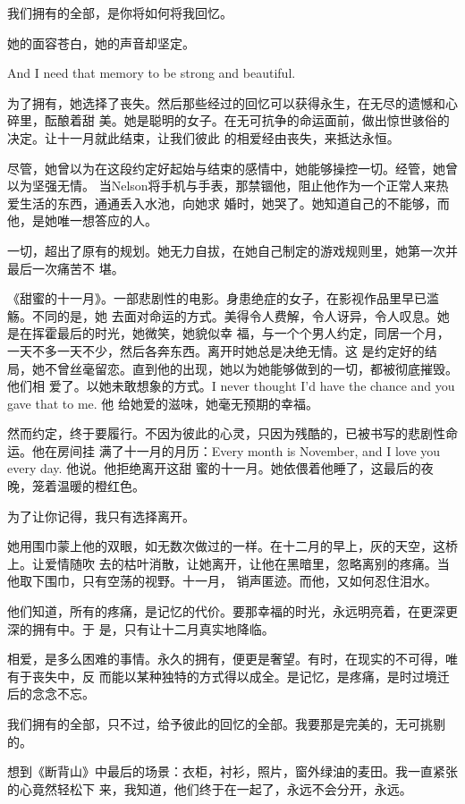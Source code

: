 		我们拥有的全部，是你将如何将我回忆。

		她的面容苍白，她的声音却坚定。

		And I need that memory to be strong and beautiful.

		为了拥有，她选择了丧失。然后那些经过的回忆可以获得永生，在无尽的遗憾和心碎里，酝酿着甜
	美。她是聪明的女子。在无可抗争的命运面前，做出惊世骇俗的决定。让十一月就此结束，让我们彼此
	的相爱经由丧失，来抵达永恒。

		尽管，她曾以为在这段约定好起始与结束的感情中，她能够操控一切。经管，她曾以为坚强无情。
	当Nelson将手机与手表，那禁锢他，阻止他作为一个正常人来热爱生活的东西，通通丢入水池，向她求
	婚时，她哭了。她知道自己的不能够，而他，是她唯一想答应的人。

		一切，超出了原有的规划。她无力自拔，在她自己制定的游戏规则里，她第一次并最后一次痛苦不
	堪。

		《甜蜜的十一月》。一部悲剧性的电影。身患绝症的女子，在影视作品里早已滥觞。不同的是，她
	去面对命运的方式。美得令人费解，令人讶异，令人叹息。她是在挥霍最后的时光，她微笑，她貌似幸
	福，与一个个男人约定，同居一个月，一天不多一天不少，然后各奔东西。离开时她总是决绝无情。这
	是约定好的结局，她不曾丝毫留恋。直到他的出现，她以为她能够做到的一切，都被彻底摧毁。他们相
	爱了。以她未敢想象的方式。I never thought I'd have the chance and you gave that to me. 他
	给她爱的滋味，她毫无预期的幸福。

		然而约定，终于要履行。不因为彼此的心灵，只因为残酷的，已被书写的悲剧性命运。他在房间挂
	满了十一月的月历：Every month is November, and I love you every day. 他说。他拒绝离开这甜
	蜜的十一月。她依偎着他睡了，这最后的夜晚，笼着温暖的橙红色。

		为了让你记得，我只有选择离开。

		她用围巾蒙上他的双眼，如无数次做过的一样。在十二月的早上，灰的天空，这桥上。让爱情随吹
	去的枯叶消散，让她离开，让他在黑暗里，忽略离别的疼痛。当他取下围巾，只有空荡的视野。十一月，
	销声匿迹。而他，又如何忍住泪水。

		他们知道，所有的疼痛，是记忆的代价。要那幸福的时光，永远明亮着，在更深更深的拥有中。于
	是，只有让十二月真实地降临。

		相爱，是多么困难的事情。永久的拥有，便更是奢望。有时，在现实的不可得，唯有于丧失中，反
	而能以某种独特的方式得以成全。是记忆，是疼痛，是时过境迁后的念念不忘。

		我们拥有的全部，只不过，给予彼此的回忆的全部。我要那是完美的，无可挑剔的。

		想到《断背山》中最后的场景：衣柜，衬衫，照片，窗外绿油的麦田。我一直紧张的心竟然轻松下
	来，我知道，他们终于在一起了，永远不会分开，永远。

